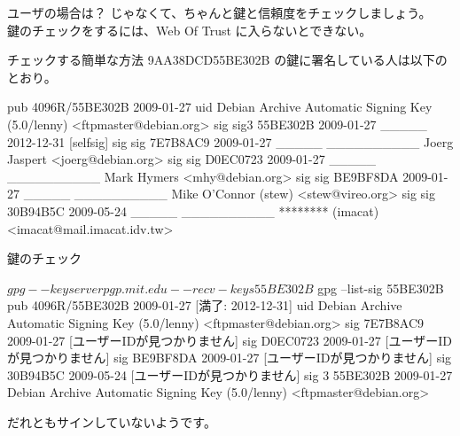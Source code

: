 \begin{frame}[containsverbatim]{ユーザの場合は？}
じゃなくて、ちゃんと鍵と信頼度をチェックしましょう。\\
鍵のチェックをするには、Web Of Trust に入らないとできない。
\end{frame}

\begin{frame}[containsverbatim]{チェックする簡単な方法}
9AA38DCD55BE302B の鍵に署名している人は以下のとおり。
\begin{commandline}
pub  4096R/55BE302B 2009-01-27            
uid Debian Archive Automatic Signing Key (5.0/lenny) <ftpmaster@debian.org>
sig  sig3  55BE302B 2009-01-27 _____ 2012-12-31 [selfsig]
sig  sig   7E7B8AC9 2009-01-27 _____ __________ Joerg Jaspert <joerg@debian.org>
sig  sig   D0EC0723 2009-01-27 _____ __________ Mark Hymers <mhy@debian.org>
sig  sig   BE9BF8DA 2009-01-27 _____ __________ Mike O'Connor (stew) <stew@vireo.org>
sig  sig   30B94B5C 2009-05-24 _____ __________ ******** (imacat) <imacat@mail.imacat.idv.tw>
\end{commandline}
\end{frame}
\begin{frame}[containsverbatim]{鍵のチェック}
\begin{commandline}
$ gpg --keyserver pgp.mit.edu --recv-keys 55BE302B
$ gpg --list-sig 55BE302B
pub   4096R/55BE302B 2009-01-27 [満了: 2012-12-31]
uid                  Debian Archive Automatic Signing Key (5.0/lenny)
<ftpmaster@debian.org>
sig          7E7B8AC9 2009-01-27  [ユーザーIDが見つかりません]
sig          D0EC0723 2009-01-27  [ユーザーIDが見つかりません]
sig          BE9BF8DA 2009-01-27  [ユーザーIDが見つかりません]
sig          30B94B5C 2009-05-24  [ユーザーIDが見つかりません]
sig 3        55BE302B 2009-01-27  Debian Archive Automatic Signing Key (5.0/lenny) <ftpmaster@debian.org>
\end{commandline}
だれともサインしていないようです。
\end{frame}



